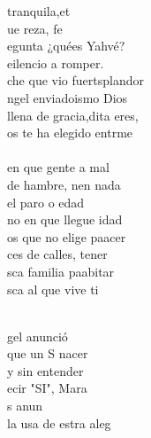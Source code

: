 \begin{cancion}%
	tranquila,et\\
	ue  reza, fe\\
	egunta ¿quées Yahvé? \\
	eilencio a romper.\\
	che que vio fuertsplandor\\
	ngel enviadoismo Dios\\
	llena de gracia,dita eres,\\
	os te ha elegido entrme\\
\jump\\
	en que gente a mal\\
	de hambre, nen nada\\
	 el paro o edad\\
	no en que llegue idad\\
	os que  no elige paacer\\
	ces de calles, tener\\
	sca familia paabitar\\
	sca al que vive ti\\\jump\\
	\begin{chorus}%
	gel anunció \\
	que un S nacer\\
	y sin entender \\
	ecir "SI", Mara\\
	s  anun \\
	la usa de estra aleg\\

\end{chorus}
\end{cancion}

